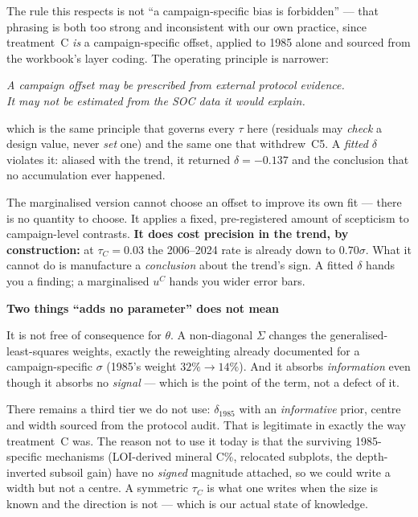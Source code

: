 \documentclass[11pt]{article}
\newenvironment{warnbox}[1][]{%
  \begin{leftbar}\noindent\textcolor{red!60!black}{\textbf{\small #1}}\par\vspace{0.3em}\small}{\end{leftbar}}
\begin{document}
The rule this respects is not ``a campaign-specific bias is forbidden'' --- that
phrasing is both too strong and inconsistent with our own practice, since treatment~C
\emph{is} a campaign-specific offset, applied to 1985 alone and sourced from the
workbook's layer coding. The operating principle is narrower:

\begin{center}
\emph{A campaign offset may be prescribed from external protocol evidence.\\
It may not be estimated from the SOC data it would explain.}
\end{center}

\noindent
which is the same principle that governs every $\tau$ here (residuals may
\emph{check} a design value, never \emph{set} one) and the same one that withdrew~C5.
A \emph{fitted} $\delta$ violates it: aliased with the trend, it returned
$\delta = -0.137$ and the conclusion that no accumulation ever happened.

The marginalised version cannot choose an offset to improve its own fit --- there is
no quantity to choose. It applies a fixed, pre-registered amount of scepticism to
campaign-level contrasts. \textbf{It does cost precision in the trend, by
construction:} at $\tau_C = 0.03$ the 2006--2024 rate is already down to
$0.70\sigma$. What it cannot do is manufacture a \emph{conclusion} about the trend's
sign. A fitted $\delta$ hands you a finding; a marginalised $u^{C}$ hands you wider
error bars.

\begin{warnbox}[Two things ``adds no parameter'' does not mean]
It is not free of consequence for $\theta$. A non-diagonal $\Sigma$ changes the
generalised-least-squares weights, exactly the reweighting already documented for a
campaign-specific $\sigma$ (1985's weight $32\% \to 14\%$). And it absorbs
\emph{information} even though it absorbs no \emph{signal} --- which is the point of
the term, not a defect of it.
\end{warnbox}

There remains a third tier we do not use: $\delta_{1985}$ with an \emph{informative}
prior, centre and width sourced from the protocol audit. That is legitimate in exactly
the way treatment~C was. The reason not to use it today is that the surviving
1985-specific mechanisms (LOI-derived mineral C\%, relocated subplots, the
depth-inverted subsoil gain) have no \emph{signed} magnitude attached, so we could
write a width but not a centre. A symmetric $\tau_C$ is what one writes when the size
is known and the direction is not --- which is our actual state of knowledge.
\end{document}
